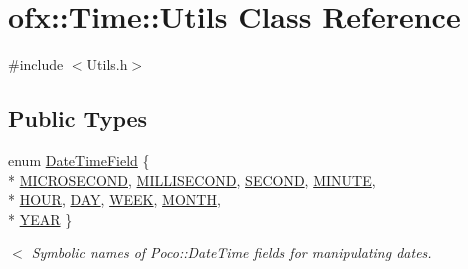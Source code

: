 \hypertarget{classofx_1_1_time_1_1_utils}{\section{ofx\-:\-:Time\-:\-:Utils Class Reference}
\label{classofx_1_1_time_1_1_utils}
}


{\ttfamily \#include $<$Utils.\-h$>$}

\subsection*{Public Types}
\begin{DoxyCompactItemize}
\item 
enum \hyperlink{classofx_1_1_time_1_1_utils_aaab0e5bd305761231f063a0701785112}{Date\-Time\-Field} \{ \\*
\hyperlink{classofx_1_1_time_1_1_utils_aaab0e5bd305761231f063a0701785112a1b374403497467803d0f39676f0f40d0}{M\-I\-C\-R\-O\-S\-E\-C\-O\-N\-D}, 
\hyperlink{classofx_1_1_time_1_1_utils_aaab0e5bd305761231f063a0701785112a3a3c031b2222608dcce148fdecedd6a0}{M\-I\-L\-L\-I\-S\-E\-C\-O\-N\-D}, 
\hyperlink{classofx_1_1_time_1_1_utils_aaab0e5bd305761231f063a0701785112aa0dd1944b7a5db923dfb56e1895996f5}{S\-E\-C\-O\-N\-D}, 
\hyperlink{classofx_1_1_time_1_1_utils_aaab0e5bd305761231f063a0701785112ad14cd310c74b7e2cd48481805f90450c}{M\-I\-N\-U\-T\-E}, 
\\*
\hyperlink{classofx_1_1_time_1_1_utils_aaab0e5bd305761231f063a0701785112a5c5879286ab99b122c9232906b6e73e8}{H\-O\-U\-R}, 
\hyperlink{classofx_1_1_time_1_1_utils_aaab0e5bd305761231f063a0701785112a9cdbc0bc6e0d800a0774fb6fe405074d}{D\-A\-Y}, 
\hyperlink{classofx_1_1_time_1_1_utils_aaab0e5bd305761231f063a0701785112a17e629da2d58085979de3088efd003dc}{W\-E\-E\-K}, 
\hyperlink{classofx_1_1_time_1_1_utils_aaab0e5bd305761231f063a0701785112a050ac18f91688a99b8a1bb51a6e62974}{M\-O\-N\-T\-H}, 
\\*
\hyperlink{classofx_1_1_time_1_1_utils_aaab0e5bd305761231f063a0701785112af4a68958f2b22b8c68820cde9a5b854f}{Y\-E\-A\-R}
 \}
\begin{DoxyCompactList}\small\item\em $<$ Symbolic names of Poco\-::\-Date\-Time fields for manipulating dates. \end{DoxyCompactList}\end{DoxyCompactItemize}
